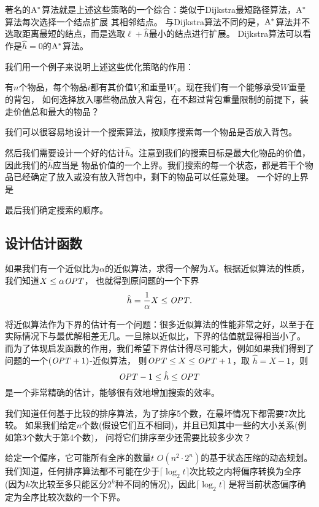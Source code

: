 著名的${\rm A}^*$算法就是上述这些策略的一个综合：类似于Dijkstra最短路径算法，${\rm A}^*$算法每次选择一个结点扩展
其相邻结点。
与Dijkstra算法不同的是，${\rm A}^*$算法并不选取距离最短的结点，而是选取$\ell + \hat h$最小的结点进行扩展。
Dijkstra算法可以看作是$\hat h=0$的${\rm A}^*$算法。

我们用一个例子来说明上述这些优化策略的作用：

\begin{prob}[01背包]
 有$n$个物品，每个物品$i$都有其价值$V_i$和重量$W_i$。现在我们有一个能够承受$W$重量的背包，
 如何选择放入哪些物品放入背包，在不超过背包重量限制的前提下，装走价值总和最大的物品？
\end{prob}

\begin{solution}
 我们可以很容易地设计一个搜索算法，按顺序搜索每一个物品是否放入背包。
 
 然后我们需要设计一个好的估计$\hat{h}$。注意到我们的搜索目标是最大化物品的价值，因此我们的$\hat h$应当是
 物品价值的一个上界。我们搜索的每一个状态，都是若干个物品已经确定了放入或没有放入背包中，剩下的物品可以任意处理。
 一个好的上界是

 最后我们确定搜索的顺序。
\end{solution}


\subsection{设计估计函数}

如果我们有一个近似比为$\alpha$的近似算法，求得一个解为$X$。根据近似算法的性质，我们知道$X \leq \alpha {\it OPT}$，
也就得到原问题的一个下界
$$\hat h = {1\over \alpha}X \leq {\it OPT}.$$

将近似算法作为下界的估计有一个问题：很多近似算法的性能非常之好，以至于在实际情况下与最优解相差无几。一旦除以近似比，下界的估值就显得相当小了。
而为了体现启发函数的作用，我们希望下界估计得尽可能大，例如如果我们得到了问题的一个$({\it OPT}+1)$-近似算法，
则${\it OPT}\le X\le {\it OPT}+1$，取
$\hat h=X-1$，则
$${\it OPT}-1 \le \hat h \le {\it OPT}$$
是一个非常精确的估计，能够很有效地增加搜索的效率。

\begin{prob}[比较排序]
 我们知道任何基于比较的排序算法，为了排序5个数，在最坏情况下都需要7次比较。
 如果我们给定$n$个数(假设它们互不相同)，并且已知其中一些的大小关系(例如第3个数大于第4个数)，
 问将它们排序至少还需要比较多少次？
\end{prob}

\begin{solution}

给定一个偏序，它可能所有全序的数量$t$
$O(n^2\cdot 2^n)$的基于状态压缩的动态规划。
我们知道，任何排序算法都不可能在少于$\lceil \log_2 t\rceil$次比较之内将偏序转换为全序
(因为$k$次比较至多只能区分$2^k$种不同的情况)，因此$\lceil \log_2 t\rceil$
是将当前状态偏序确定为全序比较次数的一个下界。

\end{solution}
